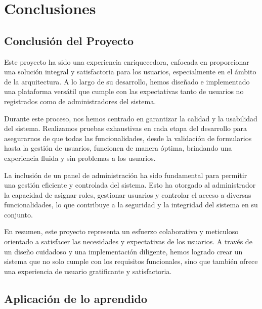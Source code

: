 \documentclass[a4paper, 12pt]{book}
\begin{document}

\cleardoublepage
\chapter{Conclusiones}
\label{chap:conclusiones}


\section{Conclusión del Proyecto}

Este proyecto ha sido una experiencia enriquecedora, enfocada en proporcionar una solución integral y satisfactoria para los usuarios, 
especialmente en el ámbito de la arquitectura. A lo largo de su desarrollo, hemos diseñado e implementado una plataforma versátil que 
cumple con las expectativas tanto de usuarios no registrados como de administradores del sistema.

Durante este proceso, nos hemos centrado en garantizar la calidad y la usabilidad del sistema. Realizamos pruebas exhaustivas en cada etapa 
del desarrollo para asegurarnos de que todas las funcionalidades, desde la validación de formularios hasta la gestión de usuarios, funcionen 
de manera óptima, brindando una experiencia fluida y sin problemas a los usuarios.

La inclusión de un panel de administración ha sido fundamental para permitir una gestión eficiente y controlada del sistema. Esto ha otorgado al 
administrador la capacidad de asignar roles, gestionar usuarios y controlar el acceso a diversas funcionalidades, lo que contribuye a la seguridad 
y la integridad del sistema en su conjunto.

En resumen, este proyecto representa un esfuerzo colaborativo y meticuloso orientado a satisfacer las necesidades y expectativas de los usuarios. 
A través de un diseño cuidadoso y una implementación diligente, hemos logrado crear un sistema que no solo cumple con los requisitos funcionales, 
sino que también ofrece una experiencia de usuario gratificante y satisfactoria.

\section{Aplicación de lo aprendido}
\label{sec:aplicacion}
\end{document}
